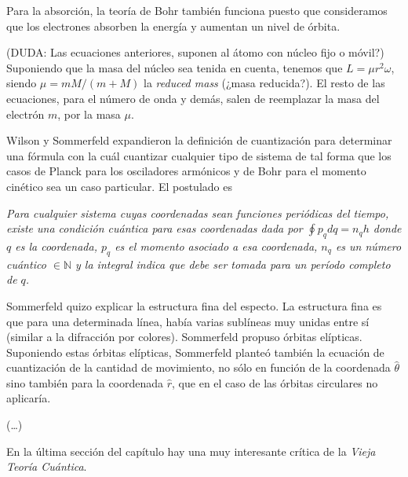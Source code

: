 \documentclass{article}
\begin{document}
Para la absorción, la teoría de Bohr también funciona puesto que consideramos que los electrones absorben la energía y aumentan un nivel de órbita.

(DUDA: Las ecuaciones anteriores, suponen al átomo con núcleo fijo o móvil?) Suponiendo que la masa del núcleo sea tenida en cuenta, tenemos que $L= \mu r^{2} \omega$, siendo $\mu = mM/(m+M)$ la \emph{reduced mass} (¿masa reducida?). El resto de las ecuaciones, para el número de onda y demás, salen de reemplazar la masa del electrón $m$, por la masa $\mu$.

Wilson y Sommerfeld expandieron la definición de cuantización para determinar una fórmula con la cuál cuantizar cualquier tipo de sistema de tal forma que los casos de Planck para los osciladores armónicos y de Bohr para el momento cinético sea un caso particular. El postulado es

\emph{Para cualquier sistema cuyas coordenadas sean funciones periódicas del tiempo, existe una condición cuántica para esas coordenadas dada por $\oint p_{q}dq = n_{q}h$ donde $q$ es la coordenada, $p_{q}$ es el momento asociado a esa coordenada, $n_{q}$ es un número cuántico $\in \mathbb{N}$ y la integral indica que debe ser tomada para un período completo de $q$.}

Sommerfeld quizo explicar la estructura fina del especto. La estructura fina es que para una determinada línea, había varias sublíneas muy unidas entre sí (similar a la difracción por colores). Sommerfeld propuso órbitas elípticas. Suponiendo estas órbitas elípticas, Sommerfeld planteó también la ecuación de cuantización de la cantidad de movimiento, no sólo en función de la coordenada $\hat{\theta}$ sino también para la coordenada $\hat{r}$, que en el caso de las órbitas circulares no aplicaría.

(\ldots)

En la última sección del capítulo hay una muy interesante crítica de la \textsl{Vieja Teoría Cuántica}.
\end{document}
